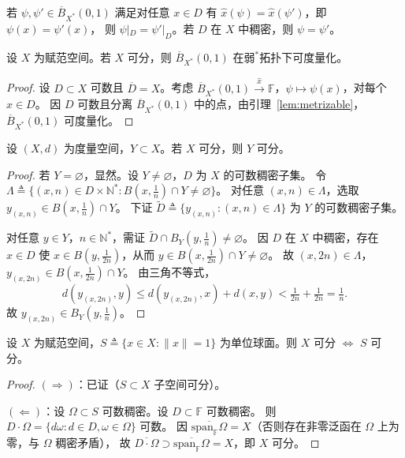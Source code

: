 \documentclass[lang=cn,a4paper,newtx,section]{elegantbook}
\begin{document}
\begin{remark}
  若 $\psi,\psi'\in\overline{B}_{X^*}(0,1)$ 满足对任意 $x\in D$ 有 $\hat{x}(\psi)=\hat{x}(\psi')$，即 $\psi(x)=\psi'(x)$，
  则 $\psi|_D=\psi'|_D$。若 $D$ 在 $X$ 中稠密，则 $\psi=\psi'$。
\end{remark}

\begin{theorem}
  设 $X$ 为赋范空间。若 $X$ 可分，则 $\overline{B}_{X^*}(0,1)$ 在弱$^*$拓扑下可度量化。
\end{theorem}

\begin{proof}
  设 $D\subset X$ 可数且 $\overline{D}=X$。考虑 $\overline{B}_{X^*}(0,1)\xrightarrow{\hat{x}}\mathbb{F}$，$\psi\mapsto\psi(x)$，对每个 $x\in D$。
  因 $D$ 可数且分离 $\overline{B}_{X^*}(0,1)$ 中的点，由引理~\ref{lem:metrizable}，$\overline{B}_{X^*}(0,1)$ 可度量化。
\end{proof}

\begin{proposition}
  设 $(X,d)$ 为度量空间，$Y\subset X$。若 $X$ 可分，则 $Y$ 可分。
\end{proposition}

\begin{proof}
  若 $Y=\varnothing$，显然。设 $Y\ne\varnothing$，$D$ 为 $X$ 的可数稠密子集。
  令 $\Lambda\triangleq\{(x,n)\in D\times\mathbb{N}^*:B(x,\tfrac{1}{n})\cap Y\ne\varnothing\}$。
  对任意 $(x,n)\in\Lambda$，选取 $y_{(x,n)}\in B(x,\tfrac{1}{n})\cap Y$。
  下证 $\tilde{D}\triangleq\{y_{(x,n)}:(x,n)\in\Lambda\}$ 为 $Y$ 的可数稠密子集。

  对任意 $y\in Y$，$n\in\mathbb{N}^*$，需证 $\tilde{D}\cap B_Y(y,\tfrac{1}{n})\ne\varnothing$。
  因 $D$ 在 $X$ 中稠密，存在 $x\in D$ 使 $x\in B(y,\tfrac{1}{2n})$，从而 $y\in B(x,\tfrac{1}{2n})\cap Y\ne\varnothing$。
  故 $(x,2n)\in\Lambda$，$y_{(x,2n)}\in B(x,\tfrac{1}{2n})\cap Y$。
  由三角不等式，
  \[
    d(y_{(x,2n)},y)\le d(y_{(x,2n)},x)+d(x,y)<\tfrac{1}{2n}+\tfrac{1}{2n}=\tfrac{1}{n}.
  \]
  故 $y_{(x,2n)}\in B_Y(y,\tfrac{1}{n})$。
\end{proof}

\begin{lemma}
  设 $X$ 为赋范空间，$S\triangleq\{x\in X:\|x\|=1\}$ 为单位球面。则 $X$ 可分 $\Longleftrightarrow$ $S$ 可分。
\end{lemma}

\begin{proof}
  $(\Rightarrow)$：已证（$S\subset X$ 子空间可分）。

  $(\Leftarrow)$：设 $\Omega\subset S$ 可数稠密。设 $D\subset\mathbb{F}$ 可数稠密。
  则 $D\cdot\Omega=\{d\omega:d\in D,\omega\in\Omega\}$ 可数。
  因 $\overline{\mathrm{span}_{\mathbb{F}}\Omega}=X$（否则存在非零泛函在 $\Omega$ 上为零，与 $\Omega$ 稠密矛盾），
  故 $\overline{D\cdot\Omega}\supset\overline{\mathrm{span}_{\mathbb{F}}\Omega}=X$，即 $X$ 可分。
\end{proof}
\end{document}

